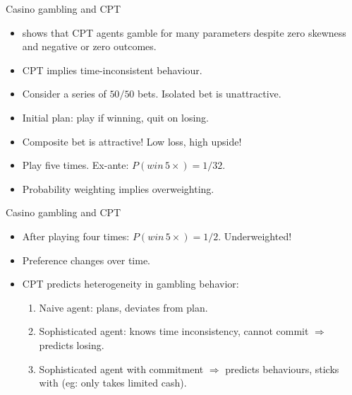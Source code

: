 \begin{frame}{Casino gambling and CPT}
    \begin{itemize}
        \item \citet{Barberis2012a} shows that CPT agents gamble for many parameters despite zero skewness and negative or zero outcomes.\medskip
        \item CPT implies time-inconsistent behaviour.\medskip
        \item Consider a series of $50/50$ bets. Isolated bet is unattractive.\medskip
        \item Initial plan: play if winning, quit on losing.\medskip
        \item Composite bet is attractive! Low loss, high upside!\medskip
        \item Play five times. Ex-ante: $P(win\, 5 \times) = 1/32$.\medskip
        \item Probability weighting implies overweighting.\medskip
    \end{itemize}
\end{frame}

\begin{frame}{Casino gambling and CPT}
    \begin{itemize}
        \item After playing four times: $P(win\, 5 \times) = 1/2$. Underweighted!\bigskip
        \item Preference changes over time.\bigskip
        \item CPT predicts heterogeneity in gambling behavior:\bigskip
        \begin{enumerate}
            \item Naive agent: plans, deviates from plan.\medskip
            \item Sophisticated agent: knows time inconsistency, cannot commit
            $\Rightarrow$ predicts losing.\medskip
            \item Sophisticated agent with commitment $\Rightarrow$ predicts behaviours, sticks with (eg: only takes limited cash).\medskip
        \end{enumerate}
    \end{itemize}
\end{frame}


